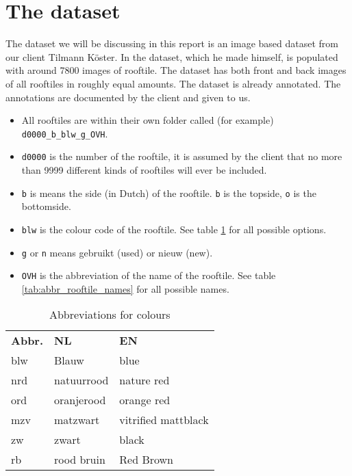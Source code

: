 \section{The dataset}
\begin{fullwidth}
	The dataset we will be discussing in this report is an image based dataset from our client Tilmann Köster. 
	In the dataset, which he made himself, is populated with around 7800 images of rooftile. 
	The dataset has both front and back images of all rooftiles in roughly equal amounts. 
	The dataset is already annotated. The annotations are documented by the client and given to us. 

	\begin{itemize}
		\item All rooftiles are within their own folder called (for example) \verb|d0000_b_blw_g_OVH|.
		\item \verb|d0000| is the number of the rooftile, it is assumed by the client that no more than 9999 different kinds of rooftiles will ever be included.
		\item \verb|b| is means the side (in Dutch) of the rooftile. \verb|b| is the topside, \verb|o| is the bottomside.
		\item \verb|blw| is the colour code of the rooftile. See table \ref{tab:abbr_colours} for all possible options.
		\item \verb|g| or \verb|n| means gebruikt (used) or nieuw (new).
		\item \verb|OVH| is the abbreviation of the name of the rooftile. See table \ref{tab:abbr_rooftile_names} for all possible names.
	\end{itemize}
\end{fullwidth}

\begin{table}[H]
    \begin{tabular}{lll}
        \textbf{Abbr.}        & \textbf{NL}         & \textbf{EN}                  \\
        blw          & Blauw      & blue                \\
        nrd          & natuurrood & nature red          \\
        ord          & oranjerood & orange red          \\
        mzv          & matzwart   & vitrified mattblack \\
        zw           & zwart      & black               \\
        rb           & rood bruin & Red Brown          
    \end{tabular}
    \caption{Abbreviations for colours}
    \label{tab:abbr_colours}
\end{table}

